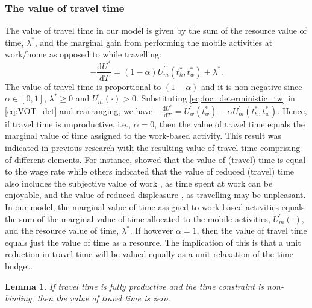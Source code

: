 \documentclass[12pt,a4paper,british]{article}
\newtheorem{lemma}{Lemma}[section]
\begin{document}
\subsubsection*{The value of travel time}
The value of travel time in our model is given by the sum of the resource value of time, $\lambda^{\ast}$, and the marginal gain from performing the mobile activities at work/home as opposed to while travelling:
\begin{equation}
-\frac{\mathrm{d}U^{\ast}}{\mathrm{d}T}  = \left(1 - \alpha\right) U_{m}^{\prime}\left(t_{h}^{\ast}, t_{w}^{\ast}\right) + \lambda^{\ast}.
\label{eq:VOT_det}
\end{equation}
The value of travel time is proportional to $\left(1 - \alpha \right)$ and it is non-negative since $\alpha \in \left[0, 1 \right]$, $\lambda^{\ast} \geq 0$ and $U_{m}^{\prime}\left( \cdot \right) > 0$. Substituting \eqref{eq:foc_deterministic_tw} in \eqref{eq:VOT_det} and rearranging, we have  $-\frac{\mathrm{d}U^{\ast}}{\mathrm{d}T}  = U_{w}^{\prime}\left(t_{w}^{\ast}\right) - \alpha U_{m}^{\prime} \left( t_{h}^{\ast}, t_{w}^{\ast}\right)$. Hence, if travel time is unproductive, i.e., $\alpha=0$, then the value of travel time equals the marginal value of time assigned to the work-based activity. This result was indicated in previous research \citep[e.g.][]{Becker1965TheoryAllocationTime,Johnson1966TravelTimePrice,Oort1969EvaluationTravellingTime,DeSerpa1971TheoryEconomicsTime} with the resulting value of travel time comprising of different elements. For instance, \citet{Becker1965TheoryAllocationTime}  showed that the value of (travel) time is equal to the wage rate while others indicated that the value of reduced (travel) time also includes the subjective value of work \citep{Johnson1966TravelTimePrice}, as time spent at work can be enjoyable, and the value of reduced displeasure \citep{Oort1969EvaluationTravellingTime}, as travelling may be unpleasant. In our model, the marginal value of time assigned to work-based activities equals the sum of the marginal value of time allocated to the mobile activities, $U_m^{\prime} \left(\cdot\right)$, and the resource value of time, $\lambda^{\ast}$. If however $\alpha=1$, then the value of travel time equals just the value of time as a resource. The implication of this is that a unit reduction in travel time will be valued equally as a unit relaxation of the time budget.


\begin{lemma}
If travel time is fully productive and the time constraint is non-binding, then the value of travel time is zero.
\end{lemma}
\end{document}
